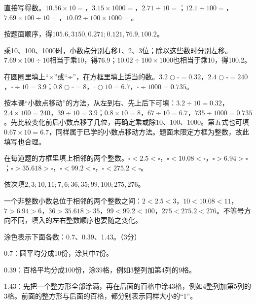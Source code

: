 直接写得数。\(10.56\times10=\)，\allowbreak{}\(3.15\times1000=\)，\allowbreak{}\(2.71\div10=\)；\allowbreak{}\(12.1\div100=\)，\allowbreak{}\(7.69\times100\div10=\)，\allowbreak{}\(10.02\div100\times1000=\)。\par
\begin{BookAnswer}
按题面顺序，得\(105.6,3150,0.271;0.121,76.9,100.2\)。\par 乘10、100、1000时，小数点分别右移1、2、3位；除以这些数时分别左移。\(7.69\times100\div10\)相当于乘10，得76.9；\allowbreak{}\(10.02\div100\times1000\)也相当于乘10，得100.2。
\end{BookAnswer}

在圆圈里填上“×”或“÷”，在方框里填上适当的数。\(3.2\bigcirc\square=0.32\)，\allowbreak{}\(2.4\bigcirc\square=240\)，\allowbreak{}\(\square\div10=3.9\)；\allowbreak{}\(0.8\bigcirc\square=8\)，\allowbreak{}\(\square\bigcirc10=6.7\)，\allowbreak{}\(\square\div1000=0.735\)。\par
\begin{BookAnswer}
按本课“小数点移动”的方法，从左到右、先上后下可填：\(3.2\div10=0.32\)，\allowbreak{}\(2.4\times100=240\)，\allowbreak{}\(39\div10=3.9\)；\allowbreak{}\(0.8\times10=8\)，\allowbreak{}\(67\div10=6.7\)，\allowbreak{}\(735\div1000=0.735\)。先比较变化前后小数点移了几位，再确定乘或除10、100、1000。第五式也可填\(0.67\times10=6.7\)，同样属于已学的小数点移动方法。题面未限定方框为整数，故此填写也合理。
\end{BookAnswer}

在每道题的方框里填上相邻的两个整数。\(\square<2.5<\square\)，\allowbreak{}\(\square<10.08<\square\)，\allowbreak{}\(\square>6.94>\square\)；\allowbreak{}\(\square>35.618>\square\)，\allowbreak{}\(\square<99.2<\square\)，\allowbreak{}\(\square<275.2<\square\)。\par
\begin{BookAnswer}
依次填\(2,3;10,11;7,6;36,35;99,100;275,276\)。\par 一个非整数小数总位于相邻的两个整数之间：\(2<2.5<3\)，\allowbreak{}\(10<10.08<11\)，\allowbreak{}\(7>6.94>6\)，\allowbreak{}\(36>35.618>35\)，\allowbreak{}\(99<99.2<100\)，\allowbreak{}\(275<275.2<276\)。不等号方向不同，填入的左右整数顺序也要随之变化。
\end{BookAnswer}

涂色表示下面各数：0.7、0.39、1.43。（3分）\par
{}
\begin{BookAnswer}
0.7：圆平均分成10份，涂其中7份。\par 0.39：百格平均分成100份，涂39格，例如3整列加第4列的9格。\par 1.43：先把一个整方形全部涂满，再在后面的百格中涂43格，例如4整列加第5列的3格。前面的整方形与后面的百格，都分别表示同样大小的“1”。
\end{BookAnswer}


